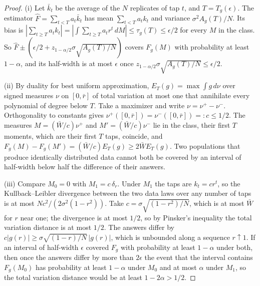 \begin{proof}
(i) Let $\bar k_t$ be the average of the $N$ replicates of tap $t$, and $T=T_g(\epsilon)$. The estimator $\hat F=\sum_{t<T}a_t\bar k_t$ has mean $\sum_{t<T}a_tk_t$ and variance $\sigma^2A_g(T)/N$. Its bias is $|\sum_{t\ge T}a_tk_t|=|\int\sum_{t\ge T}a_tr^t\,dM|\le\tau_g(T)\le\epsilon/2$ for every $M$ in the class. So $\hat F\pm(\epsilon/2+z_{1-\alpha/2}\sigma\sqrt{A_g(T)/N})$ covers $F_g(M)$ with probability at least $1-\alpha$, and its half-width is at most $\epsilon$ once $z_{1-\alpha/2}\sigma\sqrt{A_g(T)/N}\le\epsilon/2$.

(ii) By duality for best uniform approximation, $E_T(g)=\max\int g\,d\nu$ over signed measures $\nu$ on $[0,\bar r]$ of total variation at most one that annihilate every polynomial of degree below $T$. Take a maximizer and write $\nu=\nu^+-\nu^-$. Orthogonality to constants gives $\nu^+([0,\bar r])=\nu^-([0,\bar r])=:c\le1/2$. The measures $M=(\bar W/c)\nu^+$ and $M'=(\bar W/c)\nu^-$ lie in the class, their first $T$ moments, which are their first $T$ taps, coincide, and $F_g(M)-F_g(M')=(\bar W/c)E_T(g)\ge2\bar WE_T(g)$. Two populations that produce identically distributed data cannot both be covered by an interval of half-width below half the difference of their answers.

(iii) Compare $M_0=0$ with $M_1=c\,\delta_r$. Under $M_1$ the taps are $k_t=cr^t$, so the Kullback--Leibler divergence between the two data laws over any number of taps is at most $Nc^2/(2\sigma^2(1-r^2))$. Take $c=\sigma\sqrt{(1-r^2)/N}$, which is at most $\bar W$ for $r$ near one; the divergence is at most $1/2$, so by Pinsker's inequality the total variation distance is at most $1/2$. The answers differ by $c|g(r)|\ge\sigma\sqrt{(1-r)/N}\,|g(r)|$, which is unbounded along a sequence $r\uparrow1$. If an interval of half-width $\epsilon$ covered $F_g$ with probability at least $1-\alpha$ under both, then once the answers differ by more than $2\epsilon$ the event that the interval contains $F_g(M_0)$ has probability at least $1-\alpha$ under $M_0$ and at most $\alpha$ under $M_1$, so the total variation distance would be at least $1-2\alpha>1/2$.


\end{proof}
